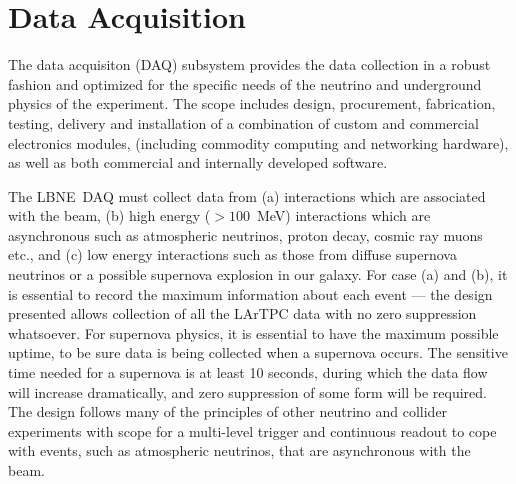 

\newcommand{\LBNE}{LBNE}
\newcommand{\COMPARTMENT}{detector section}
\newcommand{\COMPARTMENTS}{detector sections}

\chapter{Data Acquisition}
\label{ch:trig}

The data acquisiton (DAQ) subsystem provides the data collection
in a robust fashion and optimized for the specific needs of the  neutrino and
underground physics of the experiment.  The scope includes design,
procurement, fabrication, testing, delivery and installation of a
combination of custom and commercial electronics modules, (including
commodity computing and networking hardware), as well as both
commercial and internally developed software.


The \LBNE\ DAQ must collect data from (a) interactions which are
associated with the beam, (b) high energy ($>100$~MeV) interactions
which are asynchronous such as atmospheric neutrinos, proton decay,
cosmic ray muons etc., and (c) low energy interactions such as those
from diffuse supernova neutrinos or a possible supernova explosion in
our galaxy.  For case (a) and (b), it is essential to record the
maximum information about each event --- the %
design presented
allows collection of all the LArTPC data with no zero suppression
whatsoever.  For supernova physics, it is essential to have the
maximum possible uptime, to be sure data is being collected when a
supernova occurs.
The sensitive time needed for a supernova is at least 10 seconds,
during which the data flow will increase dramatically, and zero
suppression of some form will be required.  The design follows many of
the principles of other neutrino and collider experiments with scope
for a multi-level trigger and continuous readout to cope with events,
such as atmospheric neutrinos, that are asynchronous with the beam.

